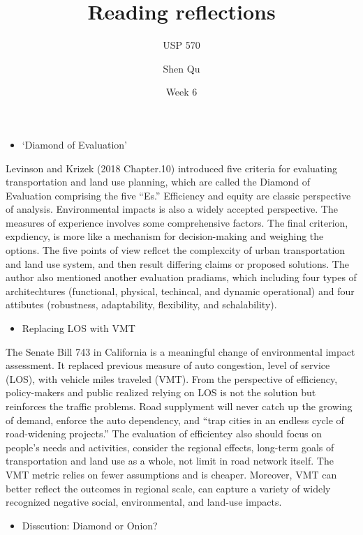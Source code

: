 \documentclass[12pt,]{article}
\title{Reading reflections}
\subtitle{USP 570}
\author{Shen Qu}
\date{Week 6}
\providecommand{\tightlist}{%
  \setlength{\itemsep}{0pt}\setlength{\parskip}{0pt}}
\begin{document}
\maketitle

\begin{itemize}
\tightlist
\item
  `Diamond of Evaluation'
\end{itemize}

Levinson and Krizek (2018 Chapter.10) introduced five criteria for
evaluating transportation and land use planning, which are called the
Diamond of Evaluation comprising the five ``Es.'' Efficiency and equity
are classic perspective of analysis. Environmental impacts is also a
widely accepted perspective. The measures of experience involves some
comprehensive factors. The final criterion, expdiency, is more like a
mechanism for decision-making and weighing the options. The five points
of view reflcet the complexcity of urban transportation and land use
system, and then result differing claims or proposed solutions. The
author also mentioned another evaluation pradiams, which including four
types of architechtures (functional, physical, techincal, and dynamic
operational) and four attibutes (robustness, adaptability, flexibility,
and schalability).

\begin{itemize}
\tightlist
\item
  Replacing LOS with VMT
\end{itemize}

The Senate Bill 743 in California is a meaningful change of
environmental impact assessment. It replaced previous measure of auto
congestion, level of service (LOS), with vehicle miles traveled (VMT).
From the perspective of efficiency, policy-makers and public realized
relying on LOS is not the solution but reinforces the traffic problems.
Road supplyment will never catch up the growing of demand, enforce the
auto dependency, and ``trap cities in an endless cycle of road-widening
projects.'' The evaluation of efficientcy also should focus on people's
needs and activities, consider the regional effects, long-term goals of
transportation and land use as a whole, not limit in road network
itself. The VMT metric relies on fewer assumptions and is cheaper.
Moreover, VMT can better reflect the outcomes in regional scale, can
capture a variety of widely recognized negative social, environmental,
and land-use impacts.

\begin{itemize}
\tightlist
\item
  Disscution: Diamond or Onion?
\end{itemize}
\end{document}
